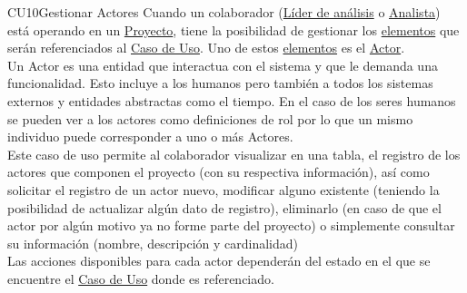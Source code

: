 	\begin{UseCase}{CU10}{Gestionar Actores}{
			Cuando un colaborador (\hyperlink{jefe}{Líder de análisis} o \hyperlink{analista}{Analista}) está operando en un \hyperlink{proyectoEntidad}{Proyecto}, tiene la posibilidad de gestionar los \hyperlink{tElemento}{elementos} que serán referenciados al \hyperlink{casoUso}{Caso de Uso}. Uno de estos \hyperlink{tElemento}{elementos} es el \hyperlink{actorEntidad}{Actor}.\\
			
			Un Actor es una entidad que interactua con el sistema y que le demanda una funcionalidad. Esto incluye a los humanos pero también  a todos los sistemas externos y entidades abstractas como el tiempo. En el caso de los seres humanos se pueden ver a los actores como definiciones de rol por lo que un mismo individuo puede corresponder a uno o más Actores.\\
			
			Este caso de uso permite al colaborador visualizar en una tabla, el registro de los actores que componen el proyecto (con su respectiva información), así como solicitar el registro de un actor nuevo, modificar alguno existente (teniendo la posibilidad de actualizar algún dato de registro), eliminarlo (en caso de que el actor por algún motivo ya no forme parte del proyecto) o simplemente consultar su información (nombre, descripción y cardinalidad) \\
			
			Las acciones disponibles para cada actor dependerán del estado en el que se encuentre el \hyperlink{casoUso}{Caso de Uso} donde es referenciado.
	}
	
\end{UseCase}
